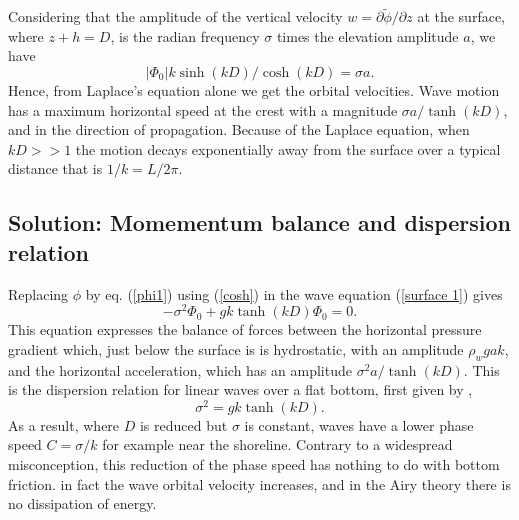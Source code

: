 Considering that the amplitude of the vertical velocity $w=\partial \widetilde{\phi} / \partial z$ at the surface, where $z+h=D$,  is the radian frequency $\sigma$ times the elevation amplitude $a$, 
we have 
\begin{equation}
    | \Phi_0 |   k \sinh (kD) / \cosh (kD) = \sigma a.
\end{equation}
Hence, from Laplace's equation alone we get the orbital velocities. Wave motion has a maximum horizontal speed at the crest with a magnitude  $\sigma a / \tanh(kD)$, and in the direction 
of propagation. Because of the Laplace equation, when $kD >> 1$ the motion decays exponentially away from the surface over a typical distance that is $1/k=L/2\pi$.



\subsection{Solution: Momementum balance and dispersion relation}
Replacing $\phi$ by eq. (\ref{phi1}) using (\ref{cosh}) in the wave equation (\ref{surface 1}) gives  
\begin{equation}
    - \sigma^2 \Phi_0 +gk\tanh\left(kD\right)\Phi_0=0.
     \label{onde 1}
\end{equation}
This equation expresses the balance of forces between the horizontal pressure gradient which, just below the surface is 
is hydrostatic, with an amplitude  $\rho_w g a k$, and the horizontal acceleration, which has an amplitude  $\sigma^2 a / \tanh(kD)$. 
This is the dispersion relation for linear waves over a flat bottom, first given by \cite{Laplace1776}, 
\begin{equation}
    \sigma^2=g k \tanh\left(kD\right).
     \label{dispersion}
\end{equation}
As a result, where $D$ is reduced but $\sigma$ is constant, waves have a lower phase speed $C=\sigma/k$  for example near the shoreline. 
Contrary to a widespread misconception, this reduction of the phase speed has nothing to do with bottom friction.
in fact the wave orbital velocity increases, and in the Airy theory there is no dissipation of energy.




